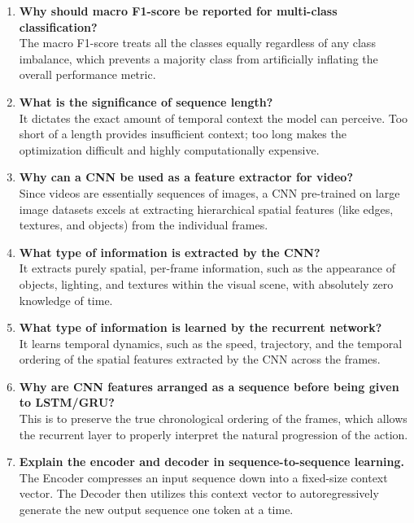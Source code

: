 \documentclass[10pt]{article}
\begin{document}
\begin{enumerate}[itemsep=0.15cm]
It identifies the asymmetric class confusions (for example, Sitting being misclassified as Standing but not as Walking) and also highlights per-class performance disparities.
    \item {\small \textbf{Why should macro F1-score be reported for multi-class classification?}} \\[0.1cm]
The macro F1-score treats all the classes equally regardless of any class imbalance, which prevents a majority class from artificially inflating the overall performance metric.
    \item {\small \textbf{What is the significance of sequence length?}} \\[0.1cm]
It dictates the exact amount of temporal context the model can perceive. Too short of a length provides insufficient context; too long makes the optimization difficult and highly computationally expensive.
    \item {\small \textbf{Why can a CNN be used as a feature extractor for video?}} \\[0.1cm]
Since videos are essentially sequences of images, a CNN pre-trained on large image datasets excels at extracting hierarchical spatial features (like edges, textures, and objects) from the individual frames.
    \item {\small \textbf{What type of information is extracted by the CNN?}} \\[0.1cm]
It extracts purely spatial, per-frame information, such as the appearance of objects, lighting, and textures within the visual scene, with absolutely zero knowledge of time.
    \item {\small \textbf{What type of information is learned by the recurrent network?}} \\[0.1cm]
It learns temporal dynamics, such as the speed, trajectory, and the temporal ordering of the spatial features extracted by the CNN across the frames.
    \item {\small \textbf{Why are CNN features arranged as a sequence before being given to LSTM/GRU?}} \\[0.1cm]
This is to preserve the true chronological ordering of the frames, which allows the recurrent layer to properly interpret the natural progression of the action.
    \item {\small \textbf{Explain the encoder and decoder in sequence-to-sequence learning.}} \\[0.1cm]
The Encoder compresses an input sequence down into a fixed-size context vector. The Decoder then utilizes this context vector to autoregressively generate the new output sequence one token at a time.

\end{enumerate}
\end{document}
